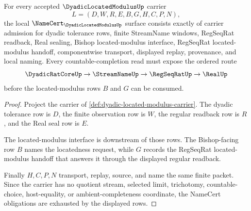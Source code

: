 \begin{theorem}
\label{thm:dyadic-located-modulus-namecert-obligations}
For every accepted $\DyadicLocatedModulusUp$ carrier
$$
L=(D,W,R,E,B,G,H,C,P,N),
$$
the local $\NameCert_{\DyadicLocatedModulusUp}$ surface consists exactly of carrier admission for dyadic tolerance rows, finite StreamName windows, RegSeqRat readback, Real sealing, Bishop located-modulus interface, RegSeqRat located-modulus handoff, componentwise transport, displayed replay, provenance, and local naming. Every countable-completion read must expose the ordered route
$$
\DyadicRatCoreUp \to \StreamNameUp \to \RegSeqRatUp \to \RealUp
$$
before the located-modulus rows $B$ and $G$ can be consumed.
\end{theorem}
\begin{proof}
Project the carrier of \autoref{def:dyadic-located-modulus-carrier}. The dyadic tolerance row is $D$, the finite observation row is $W$, the regular readback row is $R$, and the Real seal row is $E$.

The located-modulus interface is downstream of those rows. The Bishop-facing row $B$ names the locatedness request, while $G$ records the RegSeqRat located-modulus handoff that answers it through the displayed regular readback.

Finally $H,C,P,N$ transport, replay, source, and name the same finite packet. Since the carrier has no quotient stream, selected limit, trichotomy, countable-choice, host-equality, or ambient-completeness coordinate, the NameCert obligations are exhausted by the displayed rows.
\end{proof}

